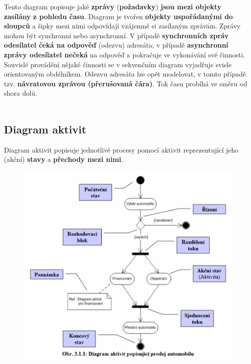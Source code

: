 Tento diagram popisuje jaké \textbf{zprávy} (\textbf{požadavky}) \textbf{jsou mezi objekty zasílány} \textbf{z pohledu času}. Diagram je tvořen \textbf{objekty uspořádanými do sloupců} a šipky mezi nimi odpovídají {vzájemně si zasílaným zprávám}. Zprávy mohou být {synchronní} nebo {asynchronní}. V případě \textbf{synchronních zpráv odesílatel čeká na odpověď} (odezvu) adresáta, v případě \textbf{asynchronní zprávy odesílatel nečeká} na odpověď a pokračuje ve vykonávání své činnosti. Souvislé provádění nějaké činnosti se v sekvenčním diagram vyjadřuje svisle orientovaným obdélníkem. Odezvu adresáta lze opět modelovat, v tomto případě tzv. \textbf{návratovou zprávou (přerušovaná čára)}. Tok času probíhá ve směru od shora dolů.
\\\\
\noindent{}

\pagebreak
\subsection{Diagram aktivit}
Diagram aktivit popisuje jednotlivé procesy pomocí aktivit reprezentující jeho (akční) \textbf{stavy} a \textbf{přechody mezi nimi}.

\begin{figure}[H]
	\centering
	\includegraphics[width=1\textwidth]{assets/diag_aktivit.png}
\end{figure}
